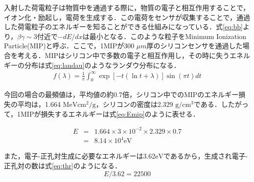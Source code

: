 入射した荷電粒子は物質中を通過する際に，物質の電子と相互作用することで，イオン化・励起し，電荷を生成する．この電荷をセンサが収集することで，通過した荷電粒子のエネルギーを知ることができる仕組みになっている．式\ref{eq:bb}より，$\beta \gamma \sim 3$付近で$-dE/dx$は最小となる．このような粒子をMinimum Ionization Particle(MIP)と呼ぶ．ここで，1MIPが300 $\mu m$厚のシリコンセンサを通過した場合を考える．MIPはシリコン中で多数の電子と相互作用し，その時に失うエネルギーの分布は式\ref{eq:landau}のようなランダウ分布になる．
\begin{eqnarray}
  \label{eq:landau}
  f(\lambda) = \frac{1}{\pi} \int ^{\infty} _0 \exp[-t (\ln t+\lambda) ] \sin(\pi t) dt
\end{eqnarray}

今回の場合の最頻値は，平均値の約0.7倍，シリコン中でのMIPのエネルギー損失の平均は，1.664 $\mathrm{MeV cm^2/g}$，シリコンの密度は2.329 $\mathrm{g/cm^3}$である．したがって，1MIPが損失するエネルギーは式\ref{eq:Emip}のように表せる．

\begin{eqnarray}
  E &=& 1.664 \times 3 \times 10^{-2} \times 2.329 \times 0.7 \nonumber \\
  \label{eq:Emip}
  &=& 8.14 \times 10^4 \mathrm{eV}
\end{eqnarray}

また，電子-正孔対生成に必要なエネルギーは3.62$\mathrm{eV}$であるから，生成され電子-正孔対の数は式\ref{eq:thr}のようになる．
\begin{equation}
  \label{eq:thr}
  E / 3.62 = 22500
\end{equation}


